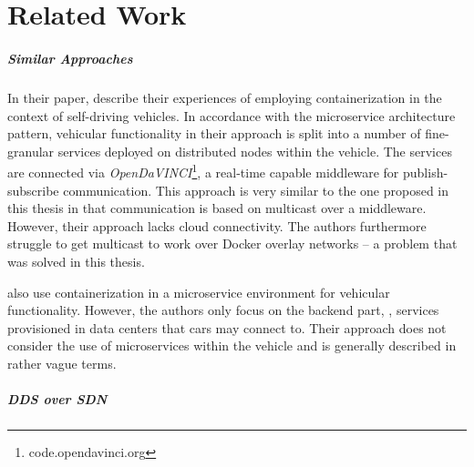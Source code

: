 \chapter{Related Work}\label{chapter:related-work}

\paragraph{Similar Approaches}

In their paper, \citeauthor*{berger2017containerized} \cite{berger2017containerized} describe their experiences of employing containerization in the context of self-driving vehicles. 
In accordance with the microservice architecture pattern, vehicular functionality in their approach is split into a number of fine-granular services deployed on distributed nodes within the vehicle. The services are connected via \emph{OpenDaVINCI}\footnote{code.opendavinci.org}, a real-time capable middleware for publish-subscribe communication. This approach is very similar to the one proposed in this thesis in that communication is based on multicast over a middleware. However, their approach lacks cloud connectivity. The authors furthermore struggle to get multicast to work over Docker overlay networks -- a problem that was solved in this thesis. 


%
%
%
%
%

\citeauthor*{schneider2016achieving} \cite{schneider2016achieving} also use containerization in a microservice environment for vehicular functionality. However, the authors only focus on the backend part, \ie , services provisioned in data centers that cars may connect to. Their approach does not consider the use of microservices within the vehicle and is generally described in rather vague terms.

%
%
%

\paragraph{DDS over SDN}

